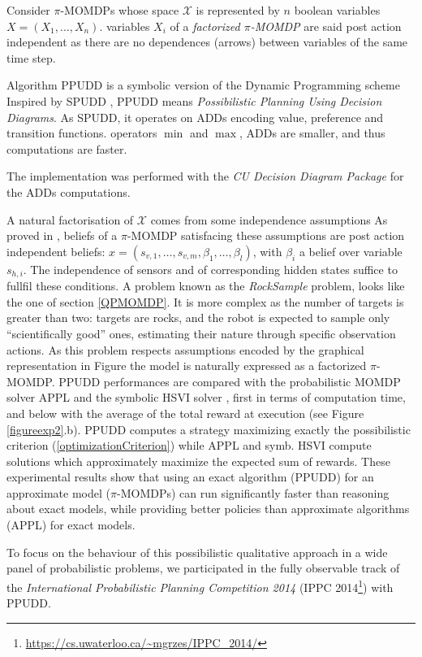 Consider $\pi$-MOMDPs 
whose space $\mathcal{X}$ is represented by
$n$ boolean variables $X=(X_1, \ldots, X_n)$.
variables $X_i$ of a \textit{factorized $\pi$-MOMDP} 
are said post action independent as there are no
dependences (arrows) between variables of the same time step.

Algorithm PPUDD is a symbolic version of 
the Dynamic Programming scheme
Inspired by SPUDD \cite{Hoey99spudd:stochastic}, 
PPUDD means \emph{Possibilistic Planning Using Decision Diagrams}. 
As SPUDD, it operates on ADDs 
encoding value, preference and transition functions.
operators $\min$ and $\max$, 
ADDs are smaller, and thus computations are faster.

The implementation was performed 
with the \textit{CU Decision Diagram Package}
for the ADDs computations. 

A natural factorisation of $\mathcal{X}$ comes from some independence assumptions
As proved in \cite{DBLP:conf/aaai/DrougardTFD14}, 
beliefs of a $\pi$-MOMDP satisfacing these assumptions
are post action independent beliefs: $x = (s_{v,1}, \ldots, s_{v,m}, \beta_1, \ldots, \beta_{l})$, 
with $\beta_i$ a belief over variable $s_{h,i}$.
The independence of sensors and of corresponding hidden states suffice to fullfil these conditions.
A problem known as 
the \textit{RockSample} problem, 
looks like the one 
of section \ref{QPMOMDP}.
It is more complex 
as the number of targets
is greater than two: 
targets are rocks, 
and the robot is expected 
to sample only ``scientifically good'' ones,
estimating their nature 
through specific observation actions.
As this problem respects assumptions 
encoded by the graphical 
representation in Figure  
the model is naturally expressed 
as a factorized $\pi$-MOMDP. 
PPUDD performances are compared with 
the probabilistic MOMDP solver APPL \cite{Kurniawati08sarsop:efficient}
and the symbolic HSVI solver \cite{citeulike:2961378},
first in terms of computation time, 
and below with the average of 
the total reward at execution 
(see Figure \ref{figureexp2}.b). 
PPUDD computes a strategy maximizing 
exactly the possibilistic criterion 
(\ref{optimizationCriterion})
while APPL and symb. HSVI compute solutions
which approximately maximize the expected sum of rewards.
These experimental results show that using an exact algorithm 
(PPUDD) for an approximate model ($\pi$-MOMDPs) 
can run significantly faster 
than reasoning about exact models, 
while providing better policies 
than approximate algorithms (APPL) 
for exact models.

To focus on the behaviour 
of this possibilistic qualitative approach 
in a wide panel of probabilistic problems, 
we participated  in the fully observable track of the 
\textit{International Probabilistic Planning Competition 2014} 
(IPPC 2014\footnote{\url{https://cs.uwaterloo.ca/~mgrzes/IPPC_2014/}})
with PPUDD. 

